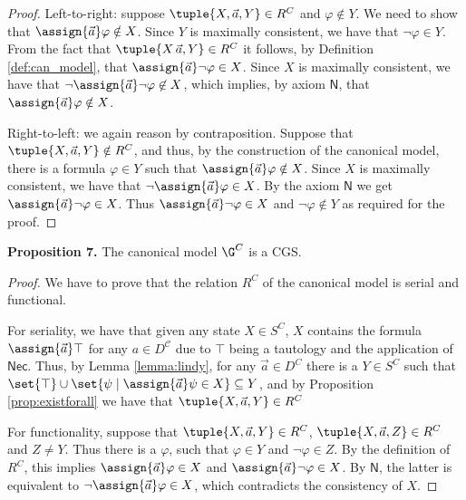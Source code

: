 \begin{proof}
    Left-to-right: suppose $\tuple{X,\vec{a},Y}\in R^C$  and $\varphi\not\in Y$. We need to show that $\assign{\vec{a}}\varphi\notin X$. Since $Y$ is maximally consistent, we have that $\neg\varphi\in Y$. From the fact that $\tuple{X\,\vec{a},Y} \in R^C$ it follows, by Definition \ref{def:can_model}, that $\assign{\vec a}\neg \varphi\in X$. Since $X$ is maximally consistent, we have that $\neg\assign{\vec a} \neg \varphi \not\in  X$, which implies, by axiom $\mathsf{N}$, that $\assign{\vec{a}}\varphi\notin X$. 
    
    Right-to-left: we again reason by contraposition. Suppose that $\tuple{X,\vec{a},Y}\notin R^C$, and thus, by the construction of the canonical model, there is a formula $\varphi \in Y$ such that $\assign{\vec a}\varphi\notin X$. Since $X$ is maximally consistent,  we have that $\neg\assign{\vec a}\varphi\in X$. By the axiom $\mathsf{N}$ we get $\assign{\vec{a}}\neg \varphi \in X$. Thus $\assign{\vec{a}}\neg \varphi \in X$ and $\neg\varphi \not\in Y$ as required for the proof. 
\end{proof}

\textbf{Proposition 7.} The canonical model $\G^C$ is a CGS.

\begin{proof}
    We have to prove that the relation $R^C$ of the canonical model is serial and functional. 
    
    For seriality, we have that given any state $X \in S^C$, %
    $X$ contains the formula $\assign{\vec{a}}\top$ for any $a\in D^\mathcal{C}$ %
    due to $\top$ being a tautology and the application of $\mathsf{Nec}$.
    Thus, by Lemma \ref{lemma:lindy}, for any $\vec{a}\in D^C$ there is a $Y\in S^C$ such that $\set{\top}\cup \set{\psi \mid  \assign{\vec a} \psi\in X} \subseteq Y $, and by Proposition \ref{prop:existforall} we have that $\tuple{X,\vec{a},Y}\in R^C$

    For functionality, suppose that $\tuple{X,\vec{a},Y}\in R^C$, $\tuple{X,\vec{a},Z}\in R^C$ and $Z\neq Y$. Thus there is a $\varphi$, such that $\varphi\in Y$ and $\neg \varphi \in Z$. By the definition of $R^C$, this implies $\assign{\vec{a}}\varphi \in X$ and $\assign{\vec a} \neg \varphi \in X$.
    By $\mathsf{N}$, the latter is equivalent to $\neg \assign{\vec a}\varphi \in X$, which contradicts the consistency of $X$.
\end{proof}

